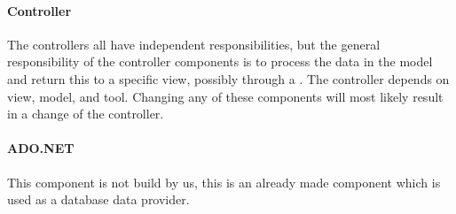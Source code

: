 \paragraph{Controller}
The controllers all have independent responsibilities, but the general responsibility of the controller components is to process the data in the model and return this to a specific view, possibly through a \viewmodel{}. The controller depends on view, model, \viewmodel{} and tool. Changing any of these components will most likely result in a change of the controller. 

\paragraph{ADO.NET}
This component is not build by us, this is an already made component which is used as a database data provider. 



